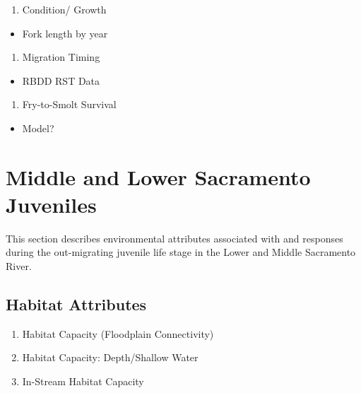 \documentclass[
]{book}
\providecommand{\tightlist}{%
  \setlength{\itemsep}{0pt}\setlength{\parskip}{0pt}}
\theoremstyle{definition}
\theoremstyle{definition}
\theoremstyle{definition}
\theoremstyle{definition}
\theoremstyle{remark}
\begin{document}
\begin{enumerate}
\def\labelenumi{\arabic{enumi}.}
\setcounter{enumi}{1}
\tightlist
\item
  Condition/ Growth
\end{enumerate}

\begin{itemize}
\tightlist
\item
  Fork length by year
\end{itemize}

\begin{enumerate}
\def\labelenumi{\arabic{enumi}.}
\setcounter{enumi}{2}
\tightlist
\item
  Migration Timing
\end{enumerate}

\begin{itemize}
\tightlist
\item
  RBDD RST Data
\end{itemize}

\begin{enumerate}
\def\labelenumi{\arabic{enumi}.}
\setcounter{enumi}{3}
\tightlist
\item
  Fry-to-Smolt Survival
\end{enumerate}

\begin{itemize}
\tightlist
\item
  Model?
\end{itemize}

\hypertarget{middle-and-lower-sacramento-juveniles}{%
\chapter{Middle and Lower Sacramento Juveniles}\label{middle-and-lower-sacramento-juveniles}}

This section describes environmental attributes associated with and responses during the out-migrating juvenile life stage in the Lower and Middle Sacramento River.

\hypertarget{habitat-attributes-3}{%
\section{Habitat Attributes}\label{habitat-attributes-3}}

\begin{enumerate}
\def\labelenumi{\arabic{enumi}.}
\item
  Habitat Capacity (Floodplain Connectivity)
\item
  Habitat Capacity: Depth/Shallow Water
\item
  In-Stream Habitat Capacity
\end{enumerate}
\end{document}
